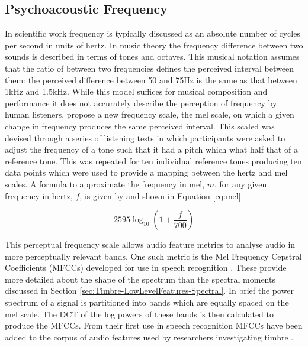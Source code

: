 	\subsection{Psychoacoustic Frequency}
	\label{sec:Timbre-PsychoacousticPrinciples-Frequency}
		In scientific work frequency is typically discussed as an absolute number of cycles per second in units of
		hertz. In music theory the frequency difference between two sounds is described in terms of tones and
		octaves.  This musical notation assumes that the ratio of between two frequencies defines the perceived
		interval between them: the perceived difference between 50 and 75Hz is the same as that between 1kHz and
		1.5kHz.  While this model suffices for musical composition and performance it does not accurately describe
		the perception of frequency by human listeners. \citep{stevens1937a} propose a new frequency scale, the mel
		scale, on which a given change in frequency produces the same perceived interval. This scaled was devised
		through a series of listening tests in which participants were asked to adjust the frequency of a tone such
		that it had a pitch which what half that of a reference tone. This was repeated for ten individual
		reference tones producing ten data points which were used to provide a mapping between the hertz and mel
		scales. A formula to approximate the frequency in mel, $m$, for any given frequency in hertz, $f$, is given
		by \cite{oshaughnessy2000speech} and shown in Equation \ref{eq:mel}.

		\begin{equation}
			2595 \log_{10} \left(1 + \frac{f}{700} \right)
			\label{eq:mel}
		\end{equation}

		This perceptual frequency scale allows audio feature metrics to analyse audio in more perceptually relevant
		bands. One such metric is the Mel Frequency Cepstral Coefficients (MFCCs) developed for use in speech
		recognition \citep{davis1980comparison}. These provide more detailed about the shape of the spectrum than
		the spectral moments discussed in Section \ref{sec:Timbre-LowLevelFeatures-Spectral}. In brief the power
		spectrum of a signal is partitioned into bands which are equally spaced on the mel scale. The DCT of the
		log powers of these bands is then calculated to produce the MFCCs. From their first use in speech
		recognition MFCCs have been added to the corpus of audio features used by researchers investigating timbre
		\citep{depoli1997sonological}. 

